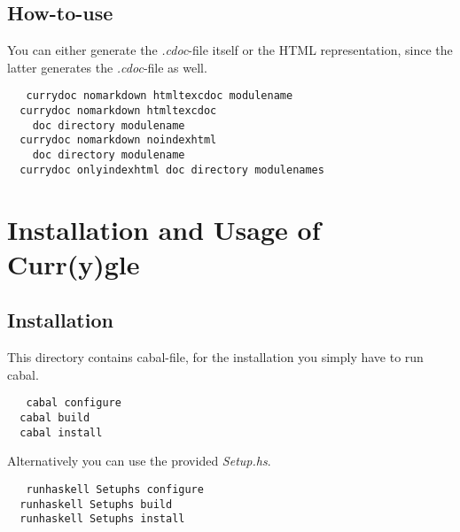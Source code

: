 \documentclass[%
	latex,%
	a4paper,%
	oneside,%
	chapterprefix,%
	headsepline,%
	12pt%
]{scrbook}
\begin{document}
\section{How-to-use}

You can either generate the \emph{.cdoc}-file itself or the HTML
representation, since the latter generates the \emph{.cdoc}-file as well.
 
\begin{tabbing}\tt
~~currydoc~nomarkdown~htmltexcdoc~modulename\\
\tt ~~currydoc~nomarkdown~htmltexcdoc~\\
\tt ~~~~doc~directory~modulename\\
\tt ~~currydoc~nomarkdown~noindexhtml~\\
\tt ~~~~doc~directory~modulename\\
\tt ~~currydoc~onlyindexhtml~doc~directory~modulenames
\end{tabbing}

\chapter{Installation and Usage of Curr(y)gle}\label{currysearch}

\section{Installation}

This directory contains cabal-file, for the installation you simply
have to run cabal.

\begin{tabbing}\tt
~~cabal~configure~\\
\tt ~~cabal~build~\\
\tt ~~cabal~install
\end{tabbing}

Alternatively you can use the provided \emph{Setup.hs}.
\begin{tabbing}\tt
~~runhaskell~Setuphs~configure\\
\tt ~~runhaskell~Setuphs~build\\
\tt ~~runhaskell~Setuphs~install
\end{tabbing}
\end{document}
